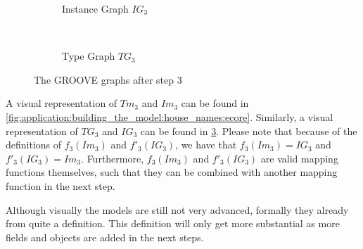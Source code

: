 \begin{figure}[p]
    \centering
    \begin{subfigure}{0.98\textwidth}
        \centering
        
        \caption{Instance Graph $IG_3$}
        \label{fig:application:building_the_model:house_names:groove:instance_graph}
    \end{subfigure}
    \\
    \begin{subfigure}{0.98\textwidth}
        \centering
        
        \caption{Type Graph $TG_3$}
        \label{fig:application:building_the_model:house_names:groove:type_graph}
    \end{subfigure}
    \caption{The GROOVE graphs after step 3}
    \label{fig:application:building_the_model:house_names:groove}
\end{figure}

A visual representation of $Tm_3$ and $Im_3$ can be found in \cref{fig:application:building_the_model:house_names:ecore}. Similarly, a visual representation of $TG_3$ and $IG_3$ can be found in \cref{fig:application:building_the_model:house_names:groove}. Please note that because of the definitions of $f_3(Im_3)$ and $f'_3(IG_3)$, we have that $f_3(Im_3) = IG_3$ and $f'_3(IG_3) = Im_3$. Furthermore, $f_3(Im_3)$ and $f'_3(IG_3)$ are valid mapping functions themselves, such that they can be combined with another mapping function in the next step.

Although visually the models are still not very advanced, formally they already from quite a definition. This definition will only get more substantial as more fields and objects are added in the next steps.

\afterpage{\FloatBarrier}